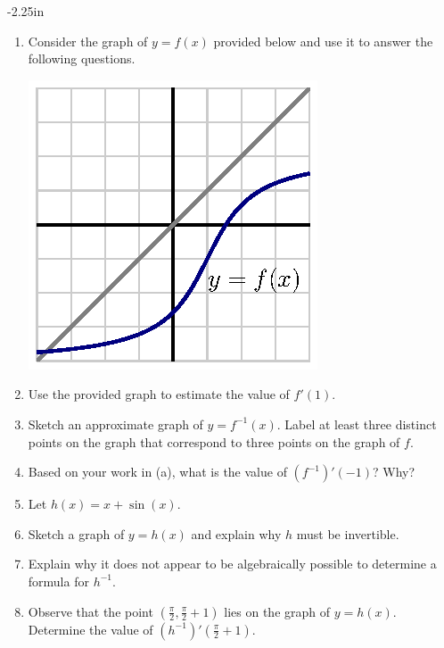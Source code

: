 \begin{adjustwidth*}{}{-2.25in}
\setlength{\columnsep}{25pt}
\begin{multicols*}{2}\small

\begin{enumerate}[1),start=38]

\item Consider the graph of $y = f(x)$ provided below and use it to answer the following questions.
\begin{center}
\includegraphics[scale=.75]{figures/2_6_Ez4.eps}
\end{center}
\ba
	\item Use the provided graph to estimate the value of $f'(1)$.
	\item Sketch an approximate graph of $y = f^{-1}(x)$.  Label at least three distinct points on the graph that correspond to three points on the graph of $f$.
	\item Based on your work in (a), what is the value of $(f^{-1})'(-1)$?  Why?
\ea

\item Let $h(x) = x + \sin(x)$.
\ba
	\item Sketch a graph of $y = h(x)$ and explain why $h$ must be invertible.
	\item Explain why it does not appear to be algebraically possible to determine a formula for $h^{-1}$.
	\item Observe that the point $(\frac{\pi}{2}, \frac{\pi}{2} + 1)$ lies on the graph of $y = h(x)$.  Determine the value of $(h^{-1})'(\frac{\pi}{2} + 1)$.
\ea
\end{enumerate}

\end{multicols*}
\end{adjustwidth*}

\afterexercises